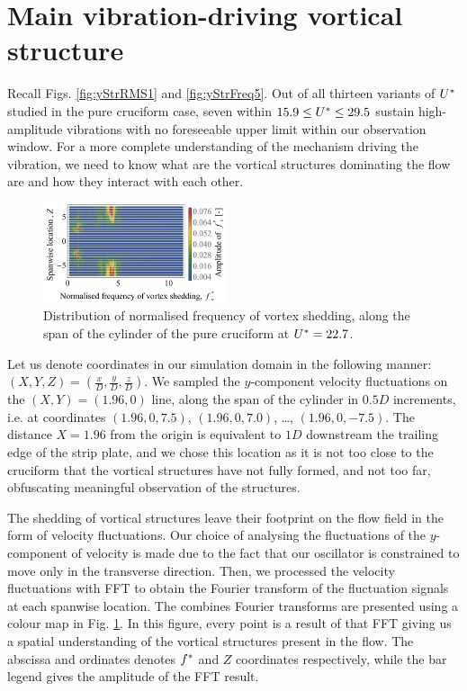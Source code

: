 \documentclass[oneside]{utmthesis}
\begin{document}
\section{Main vibration-driving vortical structure}\label{sec:svivRegimeVortStruct}
Recall Figs. \ref{fig:yStrRMS1} and \ref{fig:yStrFreq5}. Out of all thirteen variants of $U^{*}$ studied in the pure cruciform case, seven within $15.9 \leq U^{*} \leq 29.5$ sustain high-amplitude vibrations with no foreseeable upper limit within our observation window. For a more complete understanding of the mechanism driving the vibration, we need to know what are the vortical structures dominating the flow are and how they interact with each other.

\begin{figure}
  \centering
\includegraphics[width=0.48\textwidth]{figs/probe90YU10}
\caption{Distribution of normalised frequency of vortex shedding, along the span of the cylinder of the pure cruciform at $U^{*} = 22.7$.}
  \label{fig:probe90YU10}
\end{figure}

Let us denote coordinates in our simulation domain in the following manner: $\left( X, Y, Z \right) = \left( \frac{x}{D}, \frac{y}{D}, \frac{z}{D} \right)$. We sampled the $y$-component velocity fluctuations on the $\left ( X, Y \right ) = \left ( 1.96, 0 \right )$ line, along the span of the cylinder in $0.5D$ increments, i.e. at coordinates $\left ( 1.96, 0, 7.5 \right )$, $\left ( 1.96, 0, 7.0 \right )$, \dots, $\left ( 1.96, 0, -7.5 \right )$. The distance $X = 1.96$ from the origin is equivalent to $1D$ downstream the trailing edge of the strip plate, and we chose this location as it is not too close to the cruciform that the vortical structures have not fully formed, and not too far, obfuscating meaningful observation of the structures.

The shedding of vortical structures leave their footprint on the flow field in the form of velocity fluctuations. Our choice of analysing the fluctuations of the $y$-component of velocity is made due to the fact that our oscillator is constrained to move only in the transverse direction. Then, we processed the velocity fluctuations with FFT to obtain the Fourier transform of the fluctuation signals at each spanwise location. The combines Fourier transforms are presented using a colour map in Fig. \ref{fig:probe90YU10}. In this figure, every point is a result of that FFT giving us a spatial understanding of the vortical structures present in the flow. The abscissa and ordinates denotes $f^{*}$ and $Z$ coordinates respectively, while the bar legend gives the amplitude of the FFT result.
\end{document}
